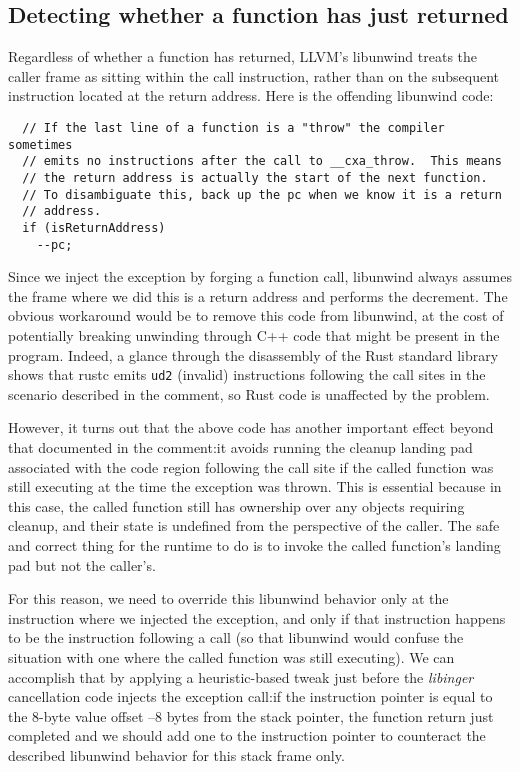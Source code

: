 \subsection{Detecting whether a function has just returned}
\label{sec:ingerc:return}

Regardless of whether a function has returned, LLVM's libunwind treats the caller
frame as sitting within the call instruction, rather than on the subsequent
instruction located at the return address.  Here is the offending libunwind code:
\begin{lstlisting}
  // If the last line of a function is a "throw" the compiler sometimes
  // emits no instructions after the call to __cxa_throw.  This means
  // the return address is actually the start of the next function.
  // To disambiguate this, back up the pc when we know it is a return
  // address.
  if (isReturnAddress)
  	--pc;
\end{lstlisting}

Since we inject the exception by forging a function call, libunwind always assumes
the frame where we did this is a return address and performs the decrement.  The
obvious workaround would be to remove this code from libunwind, at the cost of
potentially breaking unwinding through C++ code that might be present in the program.
Indeed, a glance through the disassembly of the Rust standard library shows that
rustc emits \texttt{ud2} (invalid) instructions following the call sites in the
scenario described in the comment, so Rust code is unaffected by the problem.

However, it turns out that the above code has another important effect beyond that
documented in the comment:\@ it avoids running the cleanup landing pad associated
with the code region following the call site if the called function was still
executing at the time the exception was thrown.  This is essential because in this
case, the called function still has ownership over any objects requiring cleanup, and
their state is undefined from the perspective of the caller.  The safe and correct
thing for the runtime to do is to invoke the called function's landing pad but not
the caller's.

For this reason, we need to override this libunwind behavior only at the instruction
where we injected the exception, and only if that instruction happens to be the
instruction following a call (so that libunwind would confuse the situation with one
where the called function was still executing).  We can accomplish that by applying
a heuristic-based tweak just before the \textit{libinger} cancellation code injects
the exception call:\@ if the instruction pointer is equal to the 8-byte value offset
--8 bytes from the stack pointer, the function return just completed and we should
add one to the instruction pointer to counteract the described libunwind behavior for
this stack frame only.


